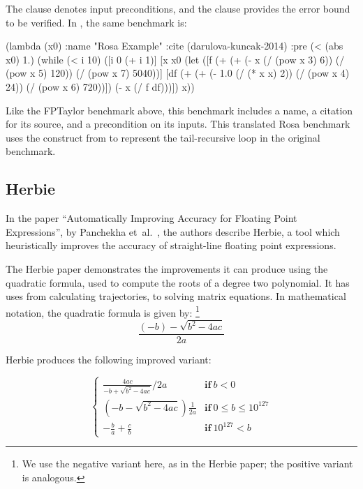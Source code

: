 \documentclass[main.tex]{subfiles}
\begin{document}
The  clause denotes input preconditions, and the
 clause provides the error bound to be verified. In
\name, the same benchmark is:

\begin{code}
(lambda (x0)
  :name "Rosa Example"
  :cite (darulova-kuncak-2014)
  :pre (< (abs x0) 1.)
  (while (< i 10)
    ([i 0 (+ i 1)]
     [x x0
      (let ([f (+ (+ (- x (/ (pow x 3) 6))
                     (/ (pow x 5) 120)) (/ (pow x 7) 5040))]
            [df (+ (+ (- 1.0 (/ (* x x) 2)) 
                      (/ (pow x 4) 24)) (/ (pow x 6) 720))])
        (- x (/ f df)))])
    x))
\end{code}

Like the FPTaylor benchmark above, this benchmark includes a name,
  a citation for its source, and a precondition on its inputs.
This translated Rosa benchmark uses the  construct from \core
  to represent the tail-recursive loop in the original benchmark.

\subsection{Herbie}

In the paper ``Automatically Improving Accuracy for Floating Point
Expressions'', by Panchekha et~al.~\cite{pavel15}, the authors
describe Herbie, a tool which heuristically improves the accuracy of
straight-line floating point expressions.

The Herbie paper demonstrates the improvements it can produce
  using the quadratic formula, used to compute the roots
  of a degree two polynomial.
It has uses from calculating trajectories, to solving matrix equations.
In mathematical notation, the quadratic formula is given by:%
\footnote{We use the negative variant here, as in the Herbie paper;
  the positive variant is analogous.}
\begin{equation*}
  \frac{(- b) - \sqrt{b^2 - 4ac}}{2a}
\end{equation*}

Herbie produces the following improved variant:

\newcommand{\K}[1]{\mathbf{#1}\:}

\begin{equation*}
\begin{cases}
  \frac{4ac}{-b + \sqrt{b^2 - 4ac}}/2a & \K{if} b < 0 \\[9pt]
  \left(-b - \sqrt{b^2 - 4ac}\right)\frac1{2a} & \K{if} 0 \le b \le 10^{127} \\[5pt]
  -\frac{b}{a} + \frac{c}{b} & \K{if} 10^{127} < b
\end{cases}
\end{equation*}
\end{document}
